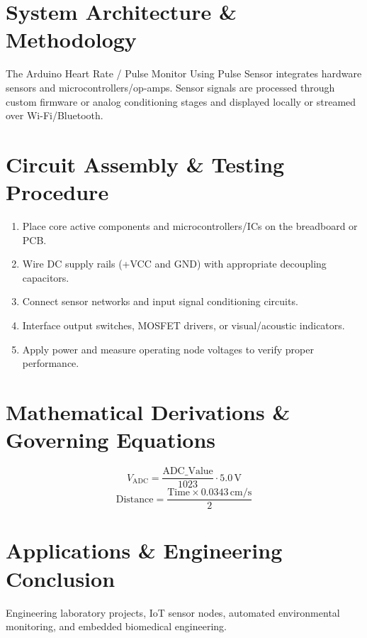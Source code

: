\documentclass[11pt,a4paper]{article}
\begin{document}
\section{System Architecture \& Methodology}
The Arduino Heart Rate / Pulse Monitor Using Pulse Sensor integrates hardware sensors and microcontrollers/op-amps. Sensor signals are processed through custom firmware or analog conditioning stages and displayed locally or streamed over Wi-Fi/Bluetooth.

\section{Circuit Assembly \& Testing Procedure}
\begin{enumerate}
    \item Place core active components and microcontrollers/ICs on the breadboard or PCB.
    \item Wire DC supply rails (+VCC and GND) with appropriate decoupling capacitors.
    \item Connect sensor networks and input signal conditioning circuits.
    \item Interface output switches, MOSFET drivers, or visual/acoustic indicators.
    \item Apply power and measure operating node voltages to verify proper performance.
\end{enumerate}

\section{Mathematical Derivations \& Governing Equations}
\begin{equation}
V_{\text{ADC}} = \frac{\text{ADC\_Value}}{1023} \cdot 5.0\,\text{V}
\end{equation}
\begin{equation}
\text{Distance} = \frac{\text{Time} \times 0.0343\,\text{cm/s}}{2}
\end{equation}

\section{Applications \& Engineering Conclusion}
Engineering laboratory projects, IoT sensor nodes, automated environmental monitoring, and embedded biomedical engineering.
\end{document}
